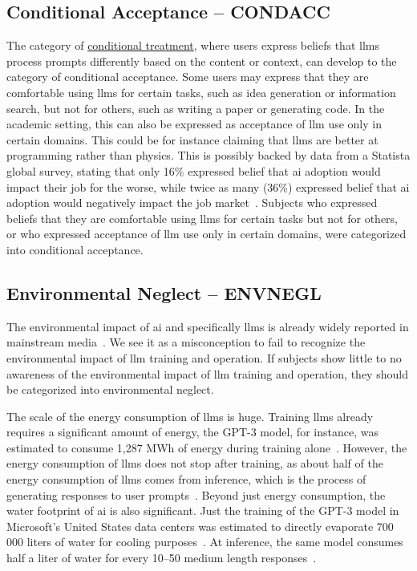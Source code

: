 \subsection{Conditional Acceptance -- CONDACC}\label{condacc}
The category of \hyperref[condtreat]{conditional treatment}, where users express beliefs that \gls{llms} process prompts differently based on the content or context, can develop to the category of conditional acceptance. Some users may express that they are comfortable using \gls{llms} for certain tasks, such as idea generation or information search, but not for others, such as writing a paper or generating code. In the academic setting, this can also be expressed as acceptance of \gls{llm} use only in certain domains. This could be for instance claiming that \gls{llms} are better at programming rather than physics. This is possibly backed by data from a Statista global survey, stating that only 16\% expressed belief that \gls{ai} adoption would impact their job for the worse, while twice as many (36\%) expressed belief that \gls{ai} adoption would negatively impact the job market~\cite{chhibber_will_2025}. 
Subjects who expressed beliefs that they are comfortable using \gls{llms} for certain tasks but not for others, or who expressed acceptance of \gls{llm} use only in certain domains, were categorized into conditional acceptance.

\subsection{Environmental Neglect -- ENVNEGL}\label{envnegl}
The environmental impact of \gls{ai} and specifically \gls{llms} is already widely reported in mainstream media~\cite{nrk_power_threat_2026,wp_trump_coal_2026,guardian_pollution_2026,savetheai_website}. We see it as a misconception to fail to recognize the environmental impact of \gls{llm} training and operation. If subjects show little to no awareness of the environmental impact of \gls{llm} training and operation, they should be categorized into environmental neglect.

The scale of the energy consumption of \gls{llms} is huge. Training \gls{llms} already requires a significant amount of energy, the GPT-3 model, for instance, was estimated to consume 1,287 MWh of energy during training alone~\cite{de_vries_growing_2023}. However, the energy consumption of \gls{llms} does not stop after training, as about half of the energy consumption of \gls{llms} comes from inference, which is the process of generating responses to user prompts~\cite{de_vries_growing_2023,oliveira_beyond_2026}.
Beyond just energy consumption, the water footprint of \gls{ai} is also significant. Just the training of the GPT-3 model in Microsoft's United States data centers was estimated to directly evaporate 700 000 liters of water for cooling purposes~\cite{li_making_2023}. At inference, the same model consumes half a liter of water for every 10–50 medium length responses~\cite{li_making_2023}.

